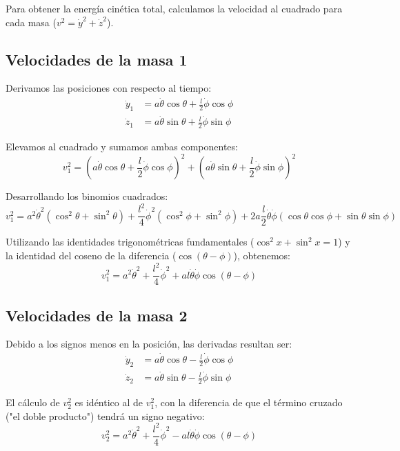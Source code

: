 \documentclass[12pt, a4paper]{article}
\begin{document}
Para obtener la energía cinética total, calculamos la velocidad al cuadrado para cada masa ($v^2 = \dot{y}^2 + \dot{z}^2$).

\subsection*{Velocidades de la masa 1}
Derivamos las posiciones con respecto al tiempo:
\begin{align}
    \dot{y}_1 &= a \dot{\theta} \cos \theta + \frac{l}{2} \dot{\phi} \cos \phi \\
    \dot{z}_1 &= a \dot{\theta} \sin \theta + \frac{l}{2} \dot{\phi} \sin \phi
\end{align}

Elevamos al cuadrado y sumamos ambas componentes:
\begin{equation}
    v_1^2 = \left(a \dot{\theta} \cos \theta + \frac{l}{2} \dot{\phi} \cos \phi\right)^2 + \left(a \dot{\theta} \sin \theta + \frac{l}{2} \dot{\phi} \sin \phi\right)^2
\end{equation}

Desarrollando los binomios cuadrados:
\[
v_1^2 = a^2 \dot{\theta}^2 (\cos^2\theta + \sin^2\theta) + \frac{l^2}{4} \dot{\phi}^2 (\cos^2\phi + \sin^2\phi) + 2a\frac{l}{2}\dot{\theta}\dot{\phi}(\cos\theta\cos\phi + \sin\theta\sin\phi)
\]

Utilizando las identidades trigonométricas fundamentales ($\cos^2 x + \sin^2 x = 1$) y la identidad del coseno de la diferencia ($\cos(\theta-\phi)$), obtenemos:
\begin{equation}
    v_1^2 = a^2 \dot{\theta}^2 + \frac{l^2}{4} \dot{\phi}^2 + a l \dot{\theta} \dot{\phi} \cos(\theta - \phi)
\end{equation}

\subsection*{Velocidades de la masa 2}
Debido a los signos menos en la posición, las derivadas resultan ser:
\begin{align}
    \dot{y}_2 &= a \dot{\theta} \cos \theta - \frac{l}{2} \dot{\phi} \cos \phi \\
    \dot{z}_2 &= a \dot{\theta} \sin \theta - \frac{l}{2} \dot{\phi} \sin \phi
\end{align}

El cálculo de $v_2^2$ es idéntico al de $v_1^2$, con la diferencia de que el término cruzado ("el doble producto") tendrá un signo negativo:
\begin{equation}
    v_2^2 = a^2 \dot{\theta}^2 + \frac{l^2}{4} \dot{\phi}^2 - a l \dot{\theta} \dot{\phi} \cos(\theta - \phi)
\end{equation}
\end{document}
